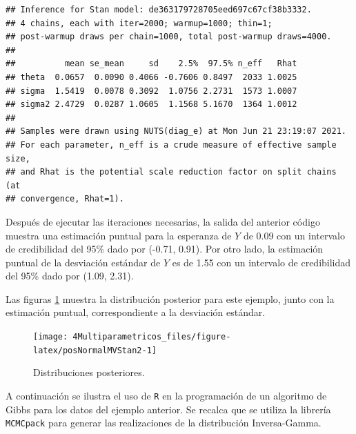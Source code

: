 \documentclass[
  10pt,
  spanish,
]{book}
\theoremstyle{definition}
\theoremstyle{definition}
\theoremstyle{definition}
\theoremstyle{definition}
\theoremstyle{remark}
\begin{document}
\begin{verbatim}
## Inference for Stan model: de363179728705eed697c67cf38b3332.
## 4 chains, each with iter=2000; warmup=1000; thin=1; 
## post-warmup draws per chain=1000, total post-warmup draws=4000.
## 
##          mean se_mean     sd    2.5%  97.5% n_eff   Rhat
## theta  0.0657  0.0090 0.4066 -0.7606 0.8497  2033 1.0025
## sigma  1.5419  0.0078 0.3092  1.0756 2.2731  1573 1.0007
## sigma2 2.4729  0.0287 1.0605  1.1568 5.1670  1364 1.0012
## 
## Samples were drawn using NUTS(diag_e) at Mon Jun 21 23:19:07 2021.
## For each parameter, n_eff is a crude measure of effective sample size,
## and Rhat is the potential scale reduction factor on split chains (at 
## convergence, Rhat=1).
\end{verbatim}

Después de ejecutar las iteraciones necesarias, la salida del anterior código muestra una estimación puntual para la esperanza de \(Y\) de 0.09 con un intervalo de credibilidad del 95\% dado por (-0.71, 0.91). Por otro lado, la estimación puntual de la desviación estándar de \(Y\) es de 1.55 con un intervalo de credibilidad del 95\% dado por (1.09, 2.31).

Las figuras \ref{fig:posNormalMVStan2} muestra la distribución posterior para este ejemplo, junto con la estimación puntual, correspondiente a la desviación estándar.

\begin{figure}

{\centering \texttt{[image: 4Multiparametricos\_files/figure-latex/posNormalMVStan2-1]} 

}

\caption{Distribuciones posteriores.}\label{fig:posNormalMVStan2}
\end{figure}

A continuación se ilustra el uso de \texttt{R} en la programación de un algoritmo de Gibbs para los datos del ejemplo anterior. Se recalca que se utiliza la librería \texttt{MCMCpack} \citep{MCMCpack} para generar las realizaciones de la distribución Inversa-Gamma.
\end{document}
